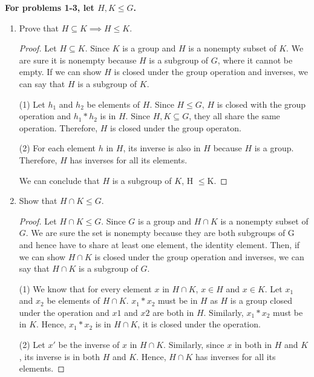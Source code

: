 \documentclass[12pt]{article}
\begin{document}
\textbf{For problems 1-3, let $H, K \leq G$.}
 \begin{enumerate}
    \item Prove that $H \subseteq K \implies H \leq K$.
    
    \begin{proof}
        

	Let $H \subseteq K$. Since $K$ is a group and $H$ is a nonempty 
    subset of $K$. We are sure it is nonempty because $H$ is a subgroup of $G$,
    where it cannot be empty.
    If we can show $H$ is closed under the group operation  
     and inverses, we can say that $H$ is a subgroup 
    of $K$.
    
(1) Let $h_1$ and $h_2$ be elements of $H$. Since $H \leq G$, $H$ is closed with the group operation and $h_1*h_2$ is in $H$. 
Since $H,K \subseteq G$, they all share the same operation.
 Therefore, $H$ is closed under
the group operaton.

(2) For each element $h$ in $H$, its inverse is also in $H$ because $H$ is a group. Therefore, $H$ has inverses for all its elements.

We can conclude that $H$ is a subgroup of $K$, H $\leq $K.
\end{proof}

    \item Show that $H \cap K \leq G$.
    \begin{proof}
        Let $H \cap K \leq G$. Since $G$ is a group and $H \cap K $ is a nonempty 
        subset of $G$. We are sure the set is nonempty because they are both subgroups of G and hence
        have to share at least one element, the identity element.
        Then, if we can show $H \cap K$ is closed under the group operation  
         and inverses, we can say that $H \cap K$ is a subgroup of $G$.

        (1) We know that for every element $x$ in $H \cap K$, $x \in H$ and 
        $x \in K$. Let $x_1$ and $x_2$ be elements of $H \cap K$. $x_1 * x_2$ must be in $H$ as $H$ 
        is a group closed under the operation and $x1$ and $x2$ are both in $H$. Similarly, $x_1 * x_2$ 
        must be in $K$. Hence, $x_1 * x_2$ is in $H \cap K$, it is closed under the operation.

        (2) Let $x'$ be the inverse of $x$ in $H \cap K$. Similarly, since $x$ in both in $H$ and $K$, 
        its inverse is in both $H$ and $K$. Hence, $H \cap K$ has inverses for all its elements.



\end{proof}
\end{enumerate}
\end{document}
